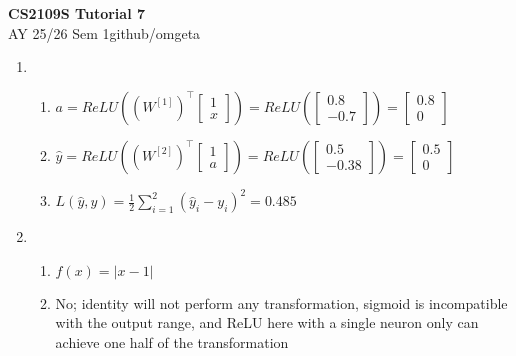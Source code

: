\documentclass[12pt, a4paper]{article}
\newcommand{\mytitle}{CS2109S Tutorial 7}
\newcommand{\myauthor}{github/omgeta}
\newcommand{\mydate}{AY 25/26 Sem 1}
\begin{document}
\raggedright
\footnotesize
\begin{center}
{\normalsize{\textbf{\mytitle}}} \\
{\footnotesize{\mydate\hspace{2pt}\textemdash\hspace{2pt}\myauthor}}
\end{center}
\begin{enumerate}[\Alph*.]
  \item 
    \begin{enumerate}[\arabic*.]
      \item $a = ReLU((W^{[1]})^{\top}\begin{bmatrix}1\\x\end{bmatrix}) = ReLU(\begin{bmatrix}0.8\\-0.7\end{bmatrix}) = \begin{bmatrix}0.8\\0\end{bmatrix}$ 
      \item $\hat{y} = ReLU((W^{[2]})^{\top}\begin{bmatrix}1\\a\end{bmatrix}) = ReLU(\begin{bmatrix}0.5\\-0.38\end{bmatrix}) = \begin{bmatrix}0.5\\0\end{bmatrix}$ 
      \item $L(\hat{y}, y) = \frac{1}{2}\sum^2_{i=1} (\hat{y}_i - y_i)^2 = 0.485$
    \end{enumerate}

  \item 
    \begin{enumerate}[\arabic*.]
      \item $f(x) = |x - 1|$

      \item No; identity will not perform any transformation, sigmoid is incompatible with the output range, and ReLU here with a single neuron only can achieve one half of the transformation 


\end{enumerate}
\end{enumerate}
\end{document}
